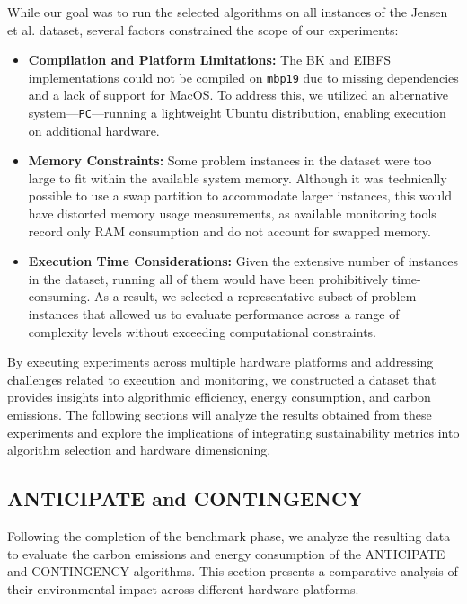 \documentclass[a4paper,singleside,12pt]{report} %
\begin{document}
While our goal was to run the selected algorithms on all instances of the Jensen et al. dataset, several factors constrained the scope of our experiments:

\begin{itemize}
    \item \textbf{Compilation and Platform Limitations:} The BK and EIBFS implementations could not be compiled on \verb|mbp19| due to missing dependencies and a lack of support for MacOS. 
    To address this, we utilized an alternative system—\verb|PC|—running a lightweight Ubuntu distribution, enabling execution on additional hardware.
    
    \item \textbf{Memory Constraints:} Some problem instances in the dataset were too large to fit within the available system memory. Although it was technically possible to use a swap 
    partition to accommodate larger instances, this would have distorted memory usage measurements, as available monitoring tools record only RAM consumption and do not account for swapped memory.
    
    \item \textbf{Execution Time Considerations:} Given the extensive number of instances in the dataset, running all of them would have been prohibitively time-consuming. As a result, we 
    selected a representative subset of problem instances that allowed us to evaluate performance across a range of complexity levels without exceeding computational constraints.
\end{itemize}

By executing experiments across multiple hardware platforms and addressing challenges related to execution and monitoring, we constructed a dataset that provides insights into algorithmic 
efficiency, energy consumption, and carbon emissions. The following sections will analyze the results obtained from these experiments and explore the implications of integrating sustainability
metrics into algorithm selection and hardware dimensioning.

\subsection{ANTICIPATE and CONTINGENCY}

Following the completion of the benchmark phase, we analyze the resulting data to evaluate the carbon emissions and energy consumption of the ANTICIPATE and CONTINGENCY algorithms. This section 
presents a comparative analysis of their environmental impact across different hardware platforms.
\end{document}

